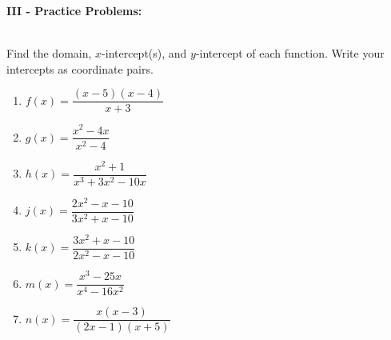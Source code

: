 \documentclass[12pt]{article}
\theoremstyle{definition}
\begin{document}
{\bf III - Practice Problems:}\\
\ \par
Find the domain, $x$-intercept(s), and $y$-intercept of each function.  Write your intercepts as coordinate pairs.
\begin{enumerate}
\item $f(x)=\dfrac{(x-5)(x-4)}{x+3}$\\
\item $g(x)=\dfrac{x^2-4x}{x^2-4}$\\
\item $h(x)=\dfrac{x^2+1}{x^3+3x^2-10x}$\\
\item $j(x)=\dfrac{2x^2-x-10}{3x^2+x-10}$\\
\item $k(x)=\dfrac{3x^2+x-10}{2x^2-x-10}$\\
\item $m(x)=\dfrac{x^3-25x}{x^4-16x^2}$\\
\item $n(x)=\dfrac{x(x-3)}{(2x-1)(x+5)}$\\
\end{enumerate}
\newpage
\end{document}
